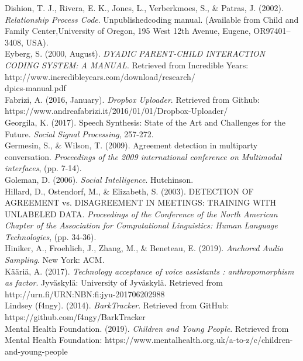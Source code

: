 \documentclass[a4paper,11pt]{report}
\begin{document}
Dishion, T. J., Rivera, E. K., Jones, L., Verberkmoes, S., \& Patras, J. (2002). \textit{Relationship Process Code}. Unpublishedcoding manual. (Available from Child and Family Center,University of Oregon, 195 West 12th Avenue, Eugene, OR97401–3408, USA).\\

Eyberg, S. (2000, August). \textit{DYADIC PARENT-CHILD INTERACTION CODING SYSTEM: A MANUAL}. Retrieved from Incredible Years: http://www.incredibleyears.com/download/research/\\dpics-manual.pdf\\

Fabrizi, A. (2016, January). \textit{Dropbox Uploader}. Retrieved from Github: https://www.andreafabrizi.it/2016/01/01/Dropbox-Uploader/\\

Georgila, K. (2017). Speech Synthesis: State of the Art and Challenges for the Future. \textit{Social Signal Processing}, 257-272.\\

Germesin, S., \& Wilson, T. (2009). Agreement detection in multiparty conversation. \textit{Proceedings of the 2009 international conference on Multimodal interfaces}, (pp. 7-14).\\

Goleman, D. (2006). \textit{Social Intelligence}. Hutchinson.\\

Hillard, D., Ostendorf, M., \& Elizabeth, S. (2003). DETECTION OF AGREEMENT vs. DISAGREEMENT IN MEETINGS: TRAINING WITH UNLABELED DATA. \textit{Proceedings of the Conference of the North American Chapter of the Association for Computational Linguistics: Human Language Technologies}, (pp. 34-36).\\

Hiniker, A., Froehlich, J., Zhang, M., \& Beneteau, E. (2019). \textit{Anchored Audio Sampling}. New York: ACM.\\

Kääriä, A. (2017). \textit{Technology acceptance of voice assistants : anthropomorphism as factor}. Jyväskylä: University of Jyväskylä. Retrieved from http://urn.fi/URN:NBN:fi:jyu-201706202988\\

Lindsey (f4ngy). (2014). \textit{BarkTracker}. Retrieved from GitHub: https://github.com/f4ngy/BarkTracker\\

Mental Health Foundation. (2019). \textit{Children and Young People}. Retrieved from Mental Health Foundation: https://www.mentalhealth.org.uk/a-to-z/c/children-and-young-people\\
\end{document}
